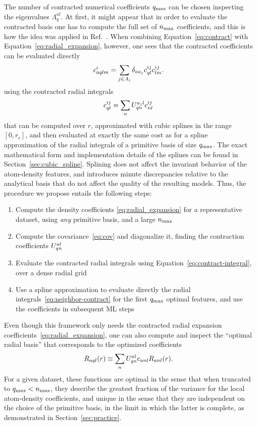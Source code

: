 The number of contracted numerical coefficients $q_\mathrm{max}$ can be chosen inspecting the eigenvalues $\Lambda^{al}_q$.
At first, it might appear that in order to evaluate the contracted basis one has to compute the full set of $n_\mathrm{max}$ coefficients, and this is how the idea was applied in Ref.~. 
When combining Equation~\eqref{eq:contract} with Equation~\eqref{eq:radial_expansion}, however, one sees that the contracted coefficients can be evaluated directly 
\begin{equation}
  c^{i}_{a qlm} = \sum_{j\in A_i} \delta_{aa_j} c^{ij}_{ql} c_{lm}^{ij}.
\label{eq:neighbor-contract}
\end{equation}
using the contracted radial integrals
\begin{equation}
  c^{ij}_{ql} = \sum_n U^{a_j l}_{qn} c^{ij}_{nl} \label{eq:contract-integral}
\end{equation}
that can be computed over $r$, approximated with cubic splines in the range $[0, r_c]$, and then evaluated at exactly the same cost as for a spline approximation of the radial integrals of a primitive basis of size $q_\mathrm{max}$.
The exact mathematical form and implementation details of the splines can be found in Section~\ref{sec:cubic_spline}.
Splining does not affect the invariant behavior of the atom-density features, and introduces minute discrepancies relative to the analytical basis that do not affect the quality of the resulting models. 
Thus, the procedure we propose entails the following steps:
\begin{enumerate}
\item Compute the density coefficients \eqref{eq:radial_expansion} for a representative dataset, using \emph{any} primitive basis, and a large $n_\mathrm{max}$
\item Compute the covariance~\eqref{eq:cov} and diagonalize it, finding the contraction coefficients $U^{a l}_{qn}$
\item Evaluate the contracted radial integrals using Equation~\eqref{eq:contract-integral}, over a dense radial grid
\item Use a spline approximation to evaluate directly the radial integrals~\eqref{eq:neighbor-contract} for the first $q_\mathrm{max}$ optimal features, and use the coefficients in subsequent ML steps
\end{enumerate}

Even though this framework only needs the contracted radial expansion coefficients~\eqref{eq:radial_expansion}, one can also compute and inspect the ``optimal radial basis'' that corresponds to the optimized coefficients  
\begin{equation}
  R_{a ql}(r) \equiv \sum_n U^{a l}_{qn} c_{a nl} R_{a nl}(r). \label{eq:contract-basis}
\end{equation}
For a given dataset, these functions are optimal in the sense that when truncated to $q_\mathrm{max}<n_\mathrm{max}$, they describe the greatest fraction of the variance for the local atom-density coefficients, and unique in the sense that they are independent on the choice of the primitive basis, in the limit in which the latter is complete, as demonstrated in Section~\ref{sec:practice}.

